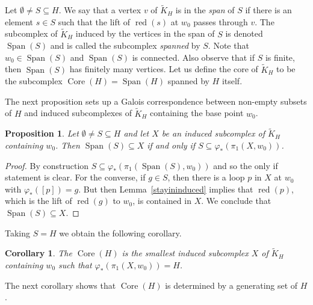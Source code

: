 \documentclass[11pt,reqno]{amsart}
\newtheorem{Prop}[Thm]{Proposition}
\newtheorem{Cor}[Thm]{Corollary}
\begin{document}
Let $\emptyset\neq S\subseteq H$.  We say that a vertex $v$ of ${\ensuremath{\widetilde {K}}}_H$ is in the \emph{span} of $S$ if there is an element $s\in S$ such that the lift of ${\mathop{\mathrm{red}}\nolimits}(s)$ at $w_0$ passes through $v$. The subcomplex of ${\ensuremath{\widetilde {K}}}_H$ induced by the vertices in the span of $S$ is denoted ${\mathop{\mathrm{Span}}\nolimits}(S)$ and is called the subcomplex \emph{spanned} by $S$. Note that $w_0\in {\mathop{\mathrm{Span}}\nolimits}(S)$ and ${\mathop{\mathrm{Span}}\nolimits}(S)$ is connected. Also observe that if $S$ is finite, then ${\mathop{\mathrm{Span}}\nolimits}(S)$ has finitely many vertices.
Let us define the core of ${\ensuremath{\widetilde {K}}}_H$ to be the subcomplex ${\mathop{\mathrm{Core}}\nolimits}(H)={\mathop{\mathrm{Span}}\nolimits}(H)$ spanned by $H$ itself.

The next proposition sets up a Galois correspondence between non-empty subsets of $H$ and induced subcomplexes of ${\ensuremath{\widetilde {K}}}_H$ containing the base point $w_0$.

\begin{Prop}\label{galoisconnection}
Let $\emptyset\neq S\subseteq H$ and let $X$ be an induced subcomplex of ${\ensuremath{\widetilde {K}}}_H$ containing $w_0$. Then ${\mathop{\mathrm{Span}}\nolimits}(S)\subseteq X$ if and only if $S\subseteq {\varphi}_*(\pi_1(X,w_0))$.
\end{Prop}
\begin{proof}
By construction $S\subseteq {\varphi}_*(\pi_1({\mathop{\mathrm{Span}}\nolimits}(S),w_0))$ and so the only if statement is clear. For the converse, if $g\in S$, then there is a loop $p$ in $X$ at $w_0$ with ${\varphi}_*([p])=g$.  But then Lemma~\ref{stayininduced} implies that ${\mathop{\mathrm{red}}\nolimits}(p)$, which is the lift of ${\mathop{\mathrm{red}}\nolimits}(g)$ to $w_0$, is contained in $X$.  We conclude that ${\mathop{\mathrm{Span}}\nolimits}(S)\subseteq X$.
\end{proof}

Taking $S=H$ we obtain the following corollary.

\begin{Cor}\label{smallestinduced}
The ${\mathop{\mathrm{Core}}\nolimits}(H)$ is the smallest induced subcomplex $X$ of ${\ensuremath{\widetilde {K}}}_H$ containing $w_0$ such that ${\varphi}_*(\pi_1(X,w_0))=H$.
\end{Cor}

The next corollary shows that ${\mathop{\mathrm{Core}}\nolimits}(H)$ is determined by a generating set of $H$.
\end{document}
